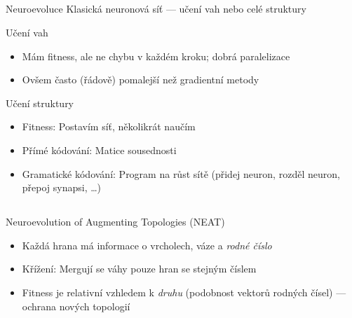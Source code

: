 \documentclass{beamer}
\begin{document}
\subsection{}
\begin{frame}{Neuroevoluce}
Klasická neuronová síť --- učení vah nebo celé struktury

\begin{block}{Učení vah}
\begin{itemize}
\item Mám fitness, ale ne chybu v každém kroku; dobrá paralelizace
\item Ovšem často (řádově) pomalejší než gradientní metody
\end{itemize}
\end{block}

\begin{block}{Učení struktury}
\begin{itemize}
\item Fitness: Postavím síť, několikrát naučím
\item Přímé kódování: Matice sousednosti
\item Gramatické kódování: Program na růst sítě (přidej neuron, rozděl neuron, přepoj synapsi, \dots)
\end{itemize}
\end{block}
\end{frame}

\subsection{}
\begin{frame}{Neuroevolution of Augmenting Topologies (NEAT)}
\begin{itemize}
\item Každá hrana má informace o vrcholech, váze a {\em rodné číslo}
\item Křížení: Mergují se váhy pouze hran se stejným číslem
\item Fitness je relativní vzhledem k {\em druhu} (podobnost vektorů rodných čísel) --- ochrana nových topologií
\end{itemize}
\end{frame}
\end{document}
